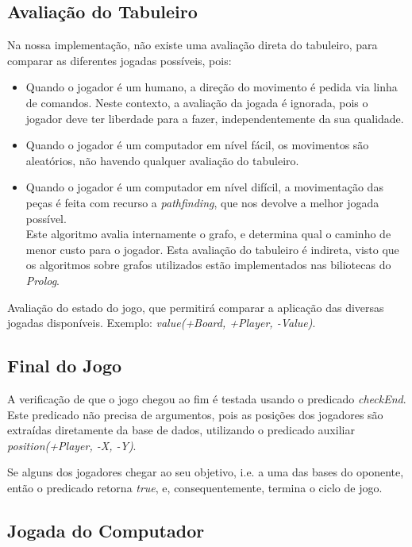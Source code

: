 \documentclass[a4paper]{article}
\begin{document}
\subsection{Avaliação do Tabuleiro} Na nossa implementação, não existe uma avaliação direta do tabuleiro, para comparar as diferentes jogadas possíveis, pois:
\begin{itemize}
	\item Quando o jogador é um humano, a direção do movimento é pedida via linha de comandos. Neste contexto, a avaliação da jogada é ignorada, pois o jogador deve ter liberdade para a fazer, independentemente da sua qualidade.
	
	\item Quando o jogador é um computador em nível fácil, os movimentos são aleatórios, não havendo qualquer avaliação do tabuleiro.
	
	\item Quando o jogador é um computador em nível difícil, a movimentação das peças é feita com recurso a \textit{pathfinding}, que nos devolve a melhor jogada possível. \\
Este algoritmo avalia internamente o grafo, e determina qual o caminho de menor custo para o jogador. Esta avaliação do tabuleiro é indireta, visto que os algoritmos sobre grafos utilizados estão implementados nas biliotecas do \textit{Prolog}.
\end{itemize}

Avaliação do estado do jogo, que permitirá comparar a aplicação das diversas jogadas disponíveis. Exemplo: \textit{value(+Board, +Player, -Value)}.

\subsection{Final do Jogo} A verificação de que o jogo chegou ao fim é testada usando o predicado \mbox{\textit{checkEnd}}. Este predicado não precisa de argumentos, pois as posições dos jogadores são extraídas diretamente da base de dados, utilizando o predicado auxiliar \textit{position(+Player, -X, -Y)}. \par
Se alguns dos jogadores chegar ao seu objetivo, i.e. a uma das bases do oponente, então o predicado retorna \textit{true}, e, consequentemente, termina o ciclo de jogo.



\subsection{Jogada do Computador} 
\end{document}

